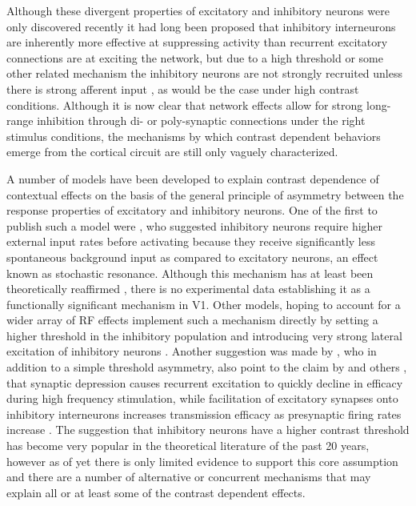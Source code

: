 Although these divergent properties of excitatory and inhibitory
neurons were only discovered recently it had long been proposed that
inhibitory interneurons are inherently more effective at suppressing
activity than recurrent excitatory connections are at exciting the
network, but due to a high threshold or some other related mechanism
the inhibitory neurons are not strongly recruited unless there is
strong afferent input \citep{Sillito1979}, as would be the case under
high contrast conditions. Although it is now clear that network
effects allow for strong long-range inhibition through di- or
poly-synaptic connections under the right stimulus conditions, the
mechanisms by which contrast dependent behaviors emerge from the
cortical circuit are still only vaguely characterized.

A number of models have been developed to explain contrast dependence
of contextual effects on the basis of the general principle of
asymmetry between the response properties of excitatory and inhibitory
neurons. One of the first to publish such a model were
\cite{Stemmler1995}, who suggested inhibitory neurons require higher
external input rates before activating because they receive
significantly less spontaneous background input as compared to
excitatory neurons, an effect known as stochastic resonance. Although
this mechanism has at least been theoretically reaffirmed
\citep{Bezrukov1997}, there is no experimental data establishing it as
a functionally significant mechanism in V1. Other models, hoping to
account for a wider array of RF effects implement such a mechanism
directly by setting a higher threshold in the inhibitory population
and introducing very strong lateral excitation of inhibitory neurons
\citep{Schwabe2006}. Another suggestion was made by \cite{Somers1998},
who in addition to a simple threshold asymmetry, also point to the
claim by \cite{Thomson1994} and others \citep{Abbott1997,Tsodyks1997},
that synaptic depression causes recurrent excitation to quickly
decline in efficacy during high frequency stimulation, while
facilitation of excitatory synapses onto inhibitory interneurons
increases transmission efficacy as presynaptic firing rates increase
\citep{Thomson1995}. The suggestion that inhibitory neurons have a
higher contrast threshold has become very popular in the theoretical
literature of the past 20 years, however as of yet there is only
limited evidence to support this core assumption and there are a
number of alternative or concurrent mechanisms that may explain all or
at least some of the contrast dependent effects.

